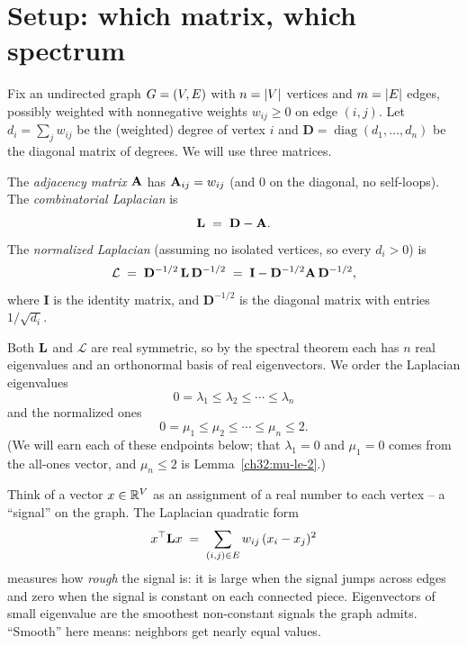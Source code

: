 \chapterline

\section{Setup: which matrix, which spectrum}
\label{ch32:setup}

Fix an undirected graph $G=(V,E)$ with $n=\lvert V\rvert$ vertices and $m=\lvert E\rvert$ edges, possibly weighted with nonnegative weights $w_{ij}\ge 0$ on edge $(i,j)$. Let $d_i=\sum_j w_{ij}$ be the (weighted) degree of vertex $i$ and $\mathbf{D}=\operatorname{diag}(d_1,\dots,d_n)$ be the diagonal matrix of degrees. We will use three matrices.

\begin{definition}
\label{ch32:three-matrices}
The \emph{adjacency matrix} $\mathbf{A}$ has $\mathbf{A}_{ij}=w_{ij}$ (and $0$ on the diagonal, no self-loops). The \emph{combinatorial Laplacian} is
\[
  \mathbf{L} \;=\; \mathbf{D} - \mathbf{A} .
\]
The \emph{normalized Laplacian} (assuming no isolated vertices, so every $d_i>0$) is
\[
  \mathcal{L} \;=\; \mathbf{D}^{-1/2}\,\mathbf{L}\,\mathbf{D}^{-1/2} \;=\; \mathbf{I} - \mathbf{D}^{-1/2}\mathbf{A}\,\mathbf{D}^{-1/2},
\]
where $\mathbf{I}$ is the identity matrix, and $\mathbf{D}^{-1/2}$ is the diagonal matrix with entries $1/\sqrt{d_i}$.
\end{definition}

Both $\mathbf{L}$ and $\mathcal{L}$ are real symmetric, so by the spectral theorem each has $n$ real eigenvalues and an orthonormal basis of real eigenvectors. We order the Laplacian eigenvalues
\[
  0 = \lambda_1 \le \lambda_2 \le \cdots \le \lambda_n
\]
and the normalized ones
\[
  0 = \mu_1 \le \mu_2 \le \cdots \le \mu_n \le 2 .
\]
(We will earn each of these endpoints below; that $\lambda_1=0$ and $\mu_1=0$ comes from the all-ones vector, and $\mu_n\le 2$ is Lemma~\ref{ch32:mu-le-2}.)

\begin{intuitionbox}
Think of a vector $x\in\mathbb{R}^V$ as an assignment of a real number to each vertex -- a ``signal'' on the graph. The Laplacian quadratic form
\[
  x^\top \mathbf{L} x \;=\; \sum_{(i,j)\in E} w_{ij}\,(x_i-x_j)^2
\]
measures how \emph{rough} the signal is: it is large when the signal jumps across edges and zero when the signal is constant on each connected piece. Eigenvectors of small eigenvalue are the smoothest non-constant signals the graph admits. ``Smooth'' here means: neighbors get nearly equal values.
\end{intuitionbox}

